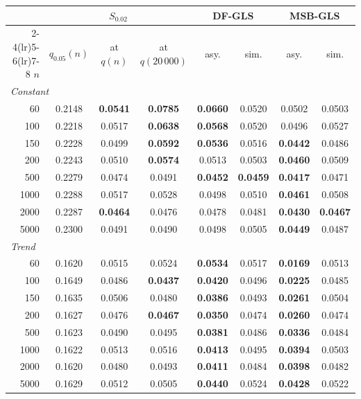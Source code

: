 \begin{tabular}{rccccccc}
\toprule
& \multicolumn{3}{c}{$S_{0.02}$} & \multicolumn{2}{c}{DF-GLS} & \multicolumn{2}{c}{MSB-GLS}\\
\cmidrule(lr){2-4}\cmidrule(lr){5-6}\cmidrule(lr){7-8}
$n$ & $q_{0.05}(n)$ & at $q(n)$ & at $q(20\,000)$ & asy. & sim. & asy. & sim.\\
\midrule
\multicolumn{8}{l}{\emph{Constant}}\\
60 & 0.2148 & \textbf{0.0541} & \textbf{0.0785} & \textbf{0.0660} & 0.0520 & 0.0502 & 0.0503 \\
100 & 0.2218 & 0.0517 & \textbf{0.0638} & \textbf{0.0568} & 0.0520 & 0.0496 & 0.0527 \\
150 & 0.2228 & 0.0499 & \textbf{0.0592} & \textbf{0.0536} & 0.0516 & \textbf{0.0442} & 0.0486 \\
200 & 0.2243 & 0.0510 & \textbf{0.0574} & 0.0513 & 0.0503 & \textbf{0.0460} & 0.0509 \\
500 & 0.2279 & 0.0474 & 0.0491 & \textbf{0.0452} & \textbf{0.0459} & \textbf{0.0417} & 0.0471 \\
1000 & 0.2288 & 0.0517 & 0.0528 & 0.0498 & 0.0510 & \textbf{0.0461} & 0.0508 \\
2000 & 0.2287 & \textbf{0.0464} & 0.0476 & 0.0478 & 0.0481 & \textbf{0.0430} & \textbf{0.0467} \\
5000 & 0.2300 & 0.0491 & 0.0490 & 0.0498 & 0.0505 & \textbf{0.0449} & 0.0487 \\
\multicolumn{8}{l}{\emph{Trend}}\\
60 & 0.1620 & 0.0515 & 0.0524 & \textbf{0.0534} & 0.0517 & \textbf{0.0169} & 0.0513 \\
100 & 0.1649 & 0.0486 & \textbf{0.0437} & \textbf{0.0420} & 0.0496 & \textbf{0.0225} & 0.0485 \\
150 & 0.1635 & 0.0506 & 0.0480 & \textbf{0.0386} & 0.0493 & \textbf{0.0261} & 0.0504 \\
200 & 0.1627 & 0.0476 & \textbf{0.0467} & \textbf{0.0350} & 0.0474 & \textbf{0.0260} & 0.0474 \\
500 & 0.1623 & 0.0490 & 0.0495 & \textbf{0.0381} & 0.0486 & \textbf{0.0336} & 0.0484 \\
1000 & 0.1622 & 0.0513 & 0.0516 & \textbf{0.0413} & 0.0495 & \textbf{0.0394} & 0.0503 \\
2000 & 0.1620 & 0.0480 & 0.0493 & \textbf{0.0411} & 0.0484 & \textbf{0.0398} & 0.0482 \\
5000 & 0.1629 & 0.0512 & 0.0505 & \textbf{0.0440} & 0.0524 & \textbf{0.0428} & 0.0522 \\
\bottomrule
\end{tabular}
